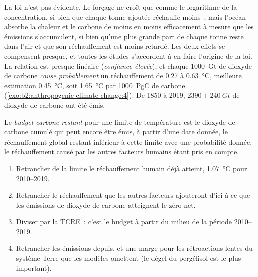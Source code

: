 La loi n'est pas évidente. Le forçage ne croît que comme le logarithme de la concentration, si bien que chaque tonne
ajoutée réchauffe moins~; mais l'océan absorbe la chaleur et le carbone de moins en moins efficacement à mesure que
les émissions s'accumulent, si bien qu'une plus grande part de chaque tonne reste dans l'air et que son réchauffement
est moins retardé. Les deux effets se compensent presque, et toutes les études s'accordent à en faire l'origine de la
loi. La relation est presque linéaire (\emph{confiance élevée}), et chaque \qty{1000}{Gt} de dioxyde de carbone
\emph{cause probablement} un réchauffement de 0.27 à \qty{0.63}{\celsius}, meilleure estimation \qty{0.45}{\celsius},
soit \qty{1.65}{\celsius} par \qty{1000}{PgC} de carbone (\cref{exo:b2:anthropogenic-climate-change:4}). De 1850 à
2019, $\num{2390} \pm \qty{240}{Gt}$ de dioxyde de carbone ont été émis.

\begin{definition}\label{def:b2:anthropogenic-climate-change:budget}
Le \emph{budget carbone restant} pour une limite de
température est le dioxyde de carbone cumulé qui peut encore être émis, à partir d'une
date donnée, le réchauffement global restant inférieur à cette limite avec une probabilité
donnée, le réchauffement causé par les autres facteurs humains étant pris en compte.
\end{definition}

\begin{method}\label{met:b2:anthropogenic-climate-change:budget}
\begin{enumerate}
  \item Retrancher de la limite le réchauffement humain déjà atteint, \qty{1.07}{\celsius} pour
        2010--2019.
  \item Retrancher le réchauffement que les autres facteurs ajouteront d'ici à ce que les émissions de
        dioxyde de carbone atteignent le zéro net.
  \item Diviser par la TCRE~: c'est le budget à partir du milieu de la période 2010--2019.
  \item Retrancher les émissions depuis, et une marge pour les rétroactions lentes du système Terre que les
        modèles omettent (le dégel du pergélisol est le plus important).
\end{enumerate}
\end{method}

